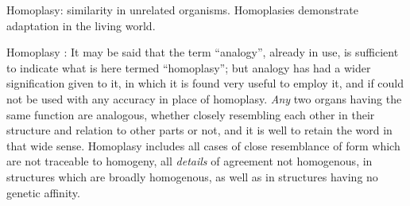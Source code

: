 Homoplasy: similarity in unrelated organisms. Homoplasies demonstrate adaptation
in the living world.

Homoplasy \citep{lankester1870}: It may be said that the term ``analogy'',
already in use, is sufficient to indicate what is here termed ``homoplasy''; but
analogy has had a wider signification given to it, in which it is found very
useful to employ it, and if could not be used with any accuracy in place of
homoplasy.  \emph{Any} two organs having the same function are analogous,
whether closely resembling each other in their structure and relation to other
parts or not, and it is well to retain the word in that wide sense. Homoplasy
includes all cases of close resemblance of form which are not traceable to
homogeny, all \emph{details} of agreement not homogenous, in structures which
are broadly homogenous, as well as in structures having no genetic affinity.
